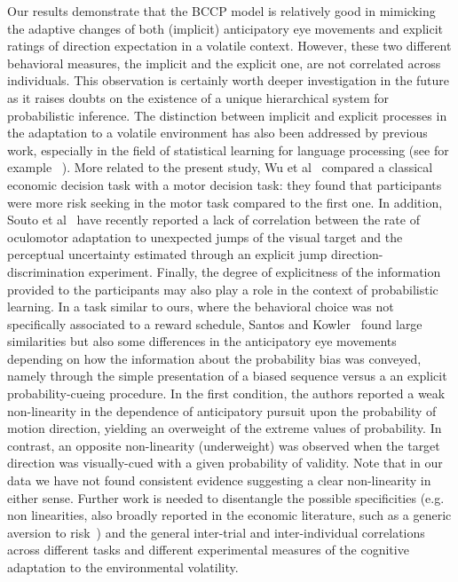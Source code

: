 \documentclass[10pt,letterpaper]{article}
\newcommand{\citep}[1]{\cite{#1}}
\newcommand{\citet}[1]{\cite{#1}}
\begin{document}
Our results demonstrate that the BCCP model is relatively good in mimicking the adaptive changes of both (implicit) anticipatory eye movements and explicit ratings of direction expectation in a volatile context. However, these two different behavioral measures, the implicit and the explicit one, are not correlated across individuals. This observation is certainly worth deeper investigation in the future as it raises doubts on the existence of a unique hierarchical system for probabilistic inference. The distinction between implicit and explicit processes in the adaptation to a volatile environment has also been addressed by previous work, especially in the field of statistical learning for language processing (see for example ~\citet{Batterink_etal_2015,SaffranAslinNewport1996}). More related to the present study, Wu et al~\citet{WuDelgadoMaloney2012} compared a classical economic decision task with a motor decision task: they found that participants were more risk seeking in the motor task compared to the first one. In addition, Souto et al~\citet{SoutoGegenfurtnerSchuetz2016} have recently reported a lack of correlation between the rate of oculomotor adaptation to unexpected jumps of the visual target and the perceptual uncertainty estimated through an explicit jump direction-discrimination experiment. Finally, the degree of explicitness of the information provided to the participants may also play a role in the context of probabilistic learning. In a task similar to ours, where the behavioral choice was not specifically associated to a reward schedule, Santos and Kowler~\citet{SantosKowler2017} found large similarities but also some differences in the anticipatory eye movements depending on how the information about the probability bias was conveyed, namely through the simple presentation of a biased sequence versus a an explicit probability-cueing procedure. In the first condition, the authors reported a weak non-linearity in the dependence of anticipatory pursuit upon the probability of motion direction, yielding an overweight of the extreme values of probability. In contrast, an opposite non-linearity (underweight) was observed when the target direction was visually-cued with a given probability of validity. Note that in our data we have not found consistent evidence suggesting a clear non-linearity in either sense. Further work is needed to disentangle the possible specificities (e.g. non linearities, also broadly reported in the economic literature, such as a generic aversion to risk~\citep{Kahneman13}) and the general inter-trial and inter-individual correlations across different tasks and different experimental measures of the cognitive adaptation to the environmental volatility.
\end{document}
